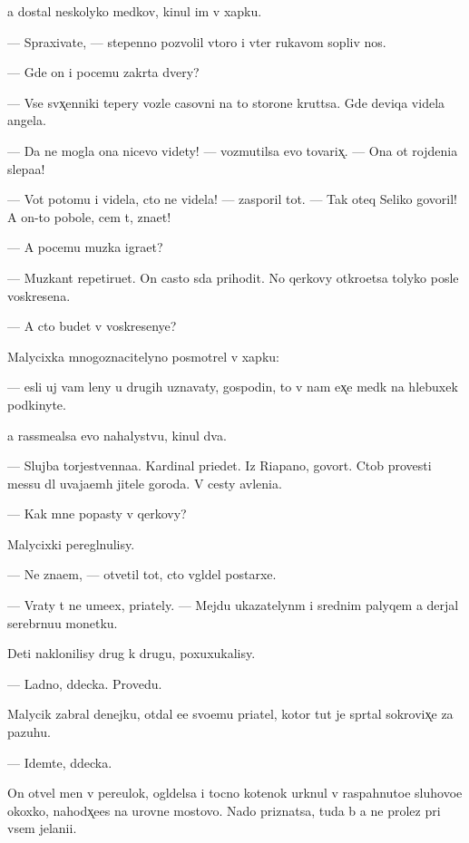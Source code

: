 \documentclass[10pt]{book}
\begin{document}
{\Y}a dostal neskolyko med{\ia}kov, kinul im v xapku.

— Spraxiva{\y}te, — stepenno pozvolil vtoro{\y} i v{\yi}ter rukavom sopliv{\yi}{\y} nos.

— Gde on i pocemu zakr{\yi}ta dvery?

— Vse sv{\ia}x̨enniki tepery vozle casovni na to{\y} storone krut{\ia}tsa. Gde deviqa videla angela.

— Da ne mogla ona nicevo videty! — vozmutilsa {\y}evo tovarix̨. — Ona ot rojdeni{\y}a slepa{\y}a!

— Vot potomu i videla, cto ne videla! — zasporil tot. — Tak oteq Seliko govoril! A on-to pobole, cem t{\yi}, zna{\y}et!

— A pocemu muz{\yi}ka igra{\y}et?

— Muz{\yi}kant repetiru{\y}et. On casto s{\iu}da prihodit. No qerkovy otkro{\y}etsa tolyko posle voskresen{\y}a.

— A cto budet v voskresenye?

Malycixka mnogoznacitelyno posmotrel v xapku:

— {\Y}esli uj vam leny u drugih uznavaty, gospodin, to v{\yi} nam {\y}ex̨e med{\ia}k na hlebuxek podkinyte.

{\Y}a rassme{\y}alsa {\y}evo nahalystvu, kinul dva.

— Slujba torjestvenna{\y}a. Kardinal pri{\y}edet. Iz Riapano, govor{\ia}t. Ctob{\yi} provesti messu dl{\ia} uvaja{\y}em{\yi}h jitele{\y} goroda. V cesty {\y}avleni{\y}a.

— Kak mne popasty v qerkovy?

Malycixki peregl{\ia}nulisy.

— Ne zna{\y}em, — otvetil tot, cto v{\yi}gl{\ia}del postarxe.

— Vraty t{\yi} ne ume{\y}ex, pri{\y}ately. — Mejdu ukazatelyn{\yi}m i srednim palyqem {\y}a derjal serebr{\ia}nu{\y}u monetku.

Deti naklonilisy drug k drugu, poxuxukalisy.

— Ladno, d{\ia}decka. Provedu.

Malycik zabral denejku, otdal {\y}e{\y}e svo{\y}emu pri{\y}atel{\iu}, kotor{\yi}{\y} tut je spr{\ia}tal sokrovix̨e za pazuhu.

— Idemte, d{\ia}decka.

On otvel men{\ia} v pereulok, ogl{\ia}delsa i tocno kotenok {\y}urknul v raspahnuto{\y}e sluhovo{\y}e okoxko, nahod{\ia}x̨e{\y}es{\ia} na urovne mostovo{\y}. Nado priznatsa, tuda b{\yi} {\y}a ne prolez pri vsem jelani{\y}i.
\end{document}
